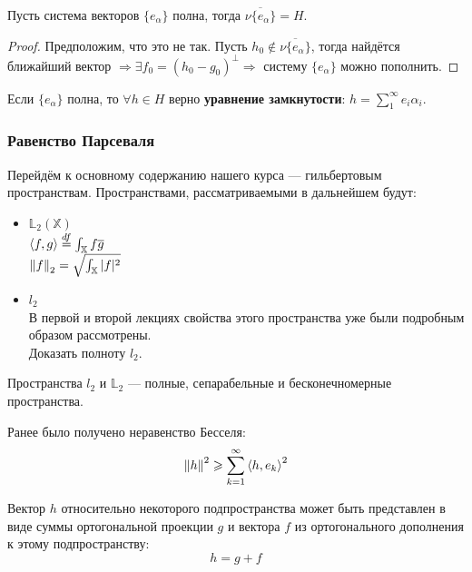 \documentclass[12pt]{article}
\begin{document}
			\begin{state}
				Пусть система векторов $\{ e_\alpha \}$ полна, тогда $\overline{ \nu \{ e_\alpha \} } = H$.
			\end{state}
			\begin{proof}
				Предположим, что это не так. Пусть $h_0 \notin \overline{ \nu \{ e_\alpha \} }$, тогда найдётся ближайший вектор $\Rightarrow
				\exists f_0 	= (h_0 - g_0)^\perp	\Rightarrow$ систему $\{ e_{\alpha} \}$ можно пополнить.
			\end{proof}

			\begin{state}
				\label{st:equality}
				Если $\{ e_\alpha \}$ полна, то $\forall h \in H$ верно \textbf{уравнение замкнутости}: $h = \sum_1^{\infty} e_i \alpha_i$.
			\end{state}

		\subsubsection{Равенство Парсеваля}


			Перейдём к основному содержанию нашего курса --- гильбертовым пространствам. Пространствами,
			рассматриваемыми в дальнейшем будут:

			\begin{itemize}
				\item $\mathbb{L}_2(\mathbb{X})$ \\
				$\left\langle f, g \right\rangle \overset{df}{=} \int_{\mathbb{X}} f\overline{g}$ \\
				$\left\| f \right\|_2 = \sqrt{\int_{\mathbb{X}} |f|^2}$ \\

				\item $l_2$ \\
				В первой и второй лекциях свойства этого пространства уже были подробным образом рассмотрены. \\
				\exc Доказать полноту $l_2$.
			\end{itemize}

			Пространства $l_2$ и $\mathbb{L}_2$ --- полные, сепарабельные и бесконечномерные пространства.

			Ранее было получено неравенство Бесселя:
			$$\left\| h \right\|^2 \geqslant \sum_{k=1}^{\infty}\left\langle h, e_k \right\rangle^2$$
			
			Вектор $h$ относительно некоторого подпространства может быть представлен в виде суммы
			ортогональной проекции $g$ и вектора $f$ из ортогонального дополнения к этому подпространству:
			$$h = g + f$$
\end{document}
